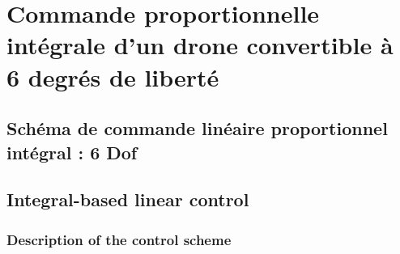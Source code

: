 \chapter{Commande proportionnelle intégrale d'un drone convertible à 6 degrés de liberté}
\minitoc

\section{Schéma de commande linéaire proportionnel intégral : 6 Dof}
\section{Integral-based linear control}
\label{sec:cmd}
\subsection{Description of the control scheme}
\label{sec:ctl_sche}

